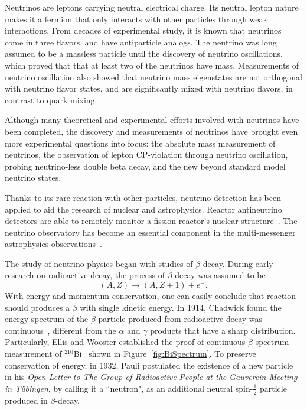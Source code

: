 \label{Ch1}

    Neutrinos are leptons carrying neutral electrical charge.
    Its neutral lepton nature makes it a fermion that only interacts with other particles through weak interactions.
    From decades of experimental study, it is known that neutrinos come in three flavors, and have antiparticle analogs.
    The neutrino was long assumed to be a massless particle until the discovery of neutrino oscillations, which proved that that at least two of the neutrinos have mass.
    Measurements of neutrino oscillation also showed that neutrino mass eigenstates are not orthogonal with neutrino flavor states, and are significantly mixed with neutrino flavors, in contrast to quark mixing.
    
    Although many theoretical and experimental efforts involved with neutrinos have been completed, the discovery and measurements of neutrinos have brought even more experimental questions into focus: the absolute mass measurement of neutrinos, the observation of lepton CP-violation through neutrino oscillation, probing neutrino-less double beta decay, and the new beyond standard model neutrino states.
    
    Thanks to its rare reaction with other particles, neutrino detection has been applied to aid the research of nuclear and astrophysics.
    Reactor antineutrino detectors are able to remotely monitor a fission reactor's nuclear structure~\cite{bib:DYBSpectrum, bib:DYBEvo}. 
    The neutrino observatory has become an essential component in the multi-messenger astrophysics observations~\cite{bib:IceCube}.

\label{Ch1Sec2}
    
    The study of neutrino physics began with studies of $\beta$-decay.
    During early research on radioactive decay, the process of $\beta$-decay was assumed to be
    \begin{equation}
    (A, Z) \rightarrow (A, Z+1) + e^-.
    \end{equation}
    With energy and momentum conservation, one can easily conclude that reaction should produces a $\beta$ with single kinetic energy.
    In 1914, Chadwick found the energy spectrum of the $\beta$ particle produced from radioactive decay was continuous~\cite{bib:Chadwick}, different from the $\alpha$ and $\gamma$ products that have a sharp distribution.
    Particularly, Ellis and Wooster established the proof of continuous $\beta$ spectrum measurement of $^{210}$Bi~\cite{bib:EandW} shown in Figure~\ref{fig:BiSpectrum}.
    To preserve conservation of energy, in 1932, Pauli postulated the existence of a new particle in his \textit{Open Letter to The Group of Radioactive People at the Gauverein Meeting in Tübingen}, by calling it a ``neutron", as an additional neutral spin-$\frac{1}{2}$ particle produced in $\beta$-decay.

